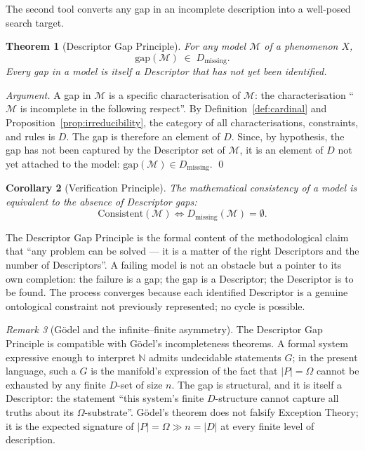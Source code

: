 \documentclass[11pt,a4paper]{article}
\newtheorem{theorem}{Theorem}[section]
\newtheorem{corollary}[theorem]{Corollary}
\theoremstyle{definition}
\theoremstyle{remark}
\newtheorem{remark}[theorem]{Remark}
\begin{document}
The second tool converts any gap in an incomplete description into a well-posed search target.

\begin{theorem}[Descriptor Gap Principle]\label{thm:descriptor-gap}
For any model $\mathcal{M}$ of a phenomenon $X$,
\[
\boxed{\;\mathrm{gap}(\mathcal{M}) \;\in\; D_{\mathrm{missing}}.\;}
\]
Every gap in a model is itself a Descriptor that has not yet been identified.
\end{theorem}

\begin{proof}[Argument]
A gap in $\mathcal{M}$ is a specific characterisation of $\mathcal{M}$: the characterisation ``$\mathcal{M}$ is incomplete in the following respect''. By Definition~\ref{def:cardinal} and Proposition~\ref{prop:irreducibility}, the category of all characterisations, constraints, and rules is $D$. The gap is therefore an element of $D$. Since, by hypothesis, the gap has not been captured by the Descriptor set of $\mathcal{M}$, it is an element of $D$ not yet attached to the model: $\mathrm{gap}(\mathcal{M})\in D_{\mathrm{missing}}$. \qed
\end{proof}

\begin{corollary}[Verification Principle]\label{cor:verification}
The mathematical consistency of a model is equivalent to the absence of Descriptor gaps:
\[
\mathrm{Consistent}(\mathcal{M}) \iff D_{\mathrm{missing}}(\mathcal{M}) = \emptyset.
\]
\end{corollary}

The Descriptor Gap Principle is the formal content of the methodological claim that ``any problem can be solved --- it is a matter of the right Descriptors and the number of Descriptors''. A failing model is not an obstacle but a pointer to its own completion: the failure is a gap; the gap is a Descriptor; the Descriptor is to be found. The process converges because each identified Descriptor is a genuine ontological constraint not previously represented; no cycle is possible.

\begin{remark}[Gödel and the infinite--finite asymmetry]
The Descriptor Gap Principle is compatible with Gödel's incompleteness theorems. A formal system expressive enough to interpret $\mathbb{N}$ admits undecidable statements $G$; in the present language, such a $G$ is the manifold's expression of the fact that $|P|=\Omega$ cannot be exhausted by any finite $D$-set of size $n$. The gap is structural, and it is itself a Descriptor: the statement ``this system's finite $D$-structure cannot capture all truths about its $\Omega$-substrate''. Gödel's theorem does not falsify Exception Theory; it is the expected signature of $|P|=\Omega \gg n = |D|$ at every finite level of description.
\end{remark}
\end{document}
